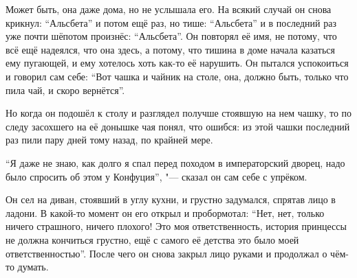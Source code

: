 Может быть, она даже дома, но не услышала его.
На всякий случай он снова крикнул: \enquote{Альсбета} и потом ещё раз, но тише:
\enquote{Альсбета} и в последний раз уже почти шёпотом произнёс:
\enquote{Альсбета}.
Он повторял её имя, не потому, что всё ещё надеялся, что она здесь, а потому,
что тишина в доме начала казаться ему пугающей, и ему хотелось хоть как-то её
нарушить.
Он пытался успокоиться и говорил сам себе:
\enquote{Вот чашка и чайник на столе, она, должно быть, только что пила чай, и
скоро вернётся}.

Но когда он подошёл к столу и разглядел получше стоявшую на нем чашку, то по
следу засохшего на её донышке чая понял, что ошибся: из этой чашки последний раз
пили пару дней тому назад, по крайней мере.

\enquote{Я даже не знаю, как долго я спал перед походом в императорский дворец,
надо было спросить об этом у Конфуция}, "--- сказал он сам себе с упрёком.

Он сел на диван, стоявший в углу кухни, и грустно задумался, спрятав лицо в
ладони.
В какой-то момент он его открыл и пробормотал:
\enquote{Нет, нет, только ничего страшного, ничего плохого!
Это моя ответственность, история принцессы не должна кончиться грустно, ещё с
самого её детства это было моей ответственностью}.
После чего он снова закрыл лицо руками и продолжал о чём-то думать.
